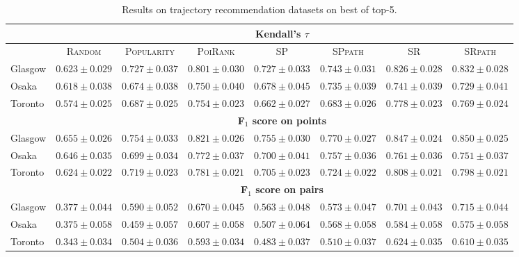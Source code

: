 \begin{table*}[!h]
\caption{Results on trajectory recommendation datasets on best of top-5.}
\centering
\scriptsize
\setlength{\tabcolsep}{3pt} %
\begin{tabular}{l|cc|cc|ccc} \hline
& \multicolumn{7}{c}{\bf Kendall's $\tau$} \\ \hline
 & \textsc{Random} & \textsc{Popularity} & \textsc{PoiRank} & \textsc{SP} & \textsc{SPpath} & \textsc{SR} & \textsc{SRpath} \\ \hline
Glasgow & $0.623\pm0.029$ & $0.727\pm0.037$ & $0.801\pm0.030$ & $0.727\pm0.033$ & $0.743\pm0.031$ & $\mathit{0.826\pm0.028}$ & $\mathbf{0.832\pm0.028}$ \\
Osaka & $0.618\pm0.038$ & $0.674\pm0.038$ & $\mathbf{0.750\pm0.040}$ & $0.678\pm0.045$ & $0.735\pm0.039$ & $\mathit{0.741\pm0.039}$ & $0.729\pm0.041$ \\
Toronto & $0.574\pm0.025$ & $0.687\pm0.025$ & $0.754\pm0.023$ & $0.662\pm0.027$ & $0.683\pm0.026$ & $\mathbf{0.778\pm0.023}$ & $\mathit{0.769\pm0.024}$ \\
\hline
& \multicolumn{7}{c}{\bf F$_1$ score on points} \\ \hline
Glasgow & $0.655\pm0.026$ & $0.754\pm0.033$ & $0.821\pm0.026$ & $0.755\pm0.030$ & $0.770\pm0.027$ & $\mathit{0.847\pm0.024}$ & $\mathbf{0.850\pm0.025}$ \\
Osaka & $0.646\pm0.035$ & $0.699\pm0.034$ & $\mathbf{0.772\pm0.037}$ & $0.700\pm0.041$ & $0.757\pm0.036$ & $\mathit{0.761\pm0.036}$ & $0.751\pm0.037$ \\
Toronto & $0.624\pm0.022$ & $0.719\pm0.023$ & $0.781\pm0.021$ & $0.705\pm0.023$ & $0.724\pm0.022$ & $\mathbf{0.808\pm0.021}$ & $\mathit{0.798\pm0.021}$ \\
\hline
& \multicolumn{7}{c}{\bf F$_1$ score on pairs} \\ \hline
Glasgow & $0.377\pm0.044$ & $0.590\pm0.052$ & $0.670\pm0.045$ & $0.563\pm0.048$ & $0.573\pm0.047$ & $\mathit{0.701\pm0.043}$ & $\mathbf{0.715\pm0.044}$ \\
Osaka & $0.375\pm0.058$ & $0.459\pm0.057$ & $\mathbf{0.607\pm0.058}$ & $0.507\pm0.064$ & $0.568\pm0.058$ & $\mathit{0.584\pm0.058}$ & $0.575\pm0.058$ \\
Toronto & $0.343\pm0.034$ & $0.504\pm0.036$ & $0.593\pm0.034$ & $0.483\pm0.037$ & $0.510\pm0.037$ & $\mathbf{0.624\pm0.035}$ & $\mathit{0.610\pm0.035}$ \\
\hline
\end{tabular}
\end{table*}



